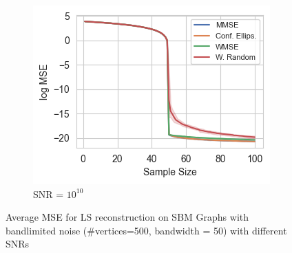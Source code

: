 \begin{figure}
\begin{subfigure}{0.3\columnwidth}
    \end{subfigure}\hfill%
    \begin{subfigure}{0.3\columnwidth}
    \includegraphics[width=\columnwidth]{figures/proj1/LS_MSE_bl_old/SBM_500_bandwidth_50_SNRdbs_100.0_samps_100_MSE_LS.png}
    \caption{SNR = $10^{10}$}%
    \label{bandlimited_SBM_MSE_subfigc}%
    \end{subfigure}%
    \caption{\color{black}Average MSE for LS reconstruction on SBM Graphs with bandlimited noise (\#vertices=500, bandwidth = 50) with different SNRs}
\label{LS_SBM_MSE_bandlimited_fig}
\end{figure}

